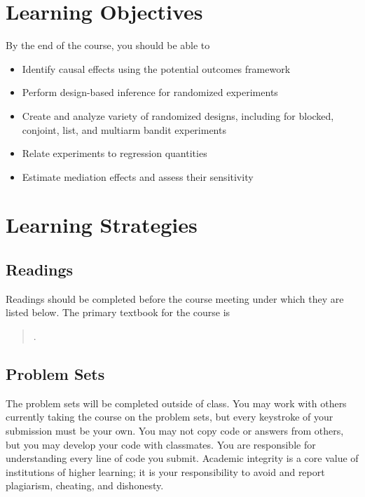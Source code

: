 \documentclass[11pt]{article}
\newcommand{\bibverse}[1]{\begin{verse} \bibentry{#1}. \end{verse}}
\begin{document}
\section*{Learning Objectives}

By the end of the course, you should be able to

\begin{itemize}
\item Identify causal effects using the potential outcomes framework
\item Perform design-based inference for randomized experiments
\item Create and analyze variety of randomized designs, including for blocked, conjoint, list, and multiarm bandit experiments
\item Relate experiments to regression quantities
\item Estimate mediation effects and assess their sensitivity
\end{itemize}

\section*{Learning Strategies}

\subsection*{Readings}

Readings should be completed before the course meeting under which they are listed 
below. The primary textbook for the course is

\nobibliography*
{}

\bibverse{gergre12}


\subsection*{Problem Sets}

The problem sets will be completed outside of class. You may work with others 
currently taking the course on the problem sets, but every keystroke of your 
submission must be your own. You may not copy code or answers from others, but 
you may develop your code with classmates. You are responsible for understanding 
every line of code you submit. Academic integrity is a core value of institutions 
of higher learning; it is your responsibility to avoid and report plagiarism, 
cheating, and dishonesty.
\end{document}
